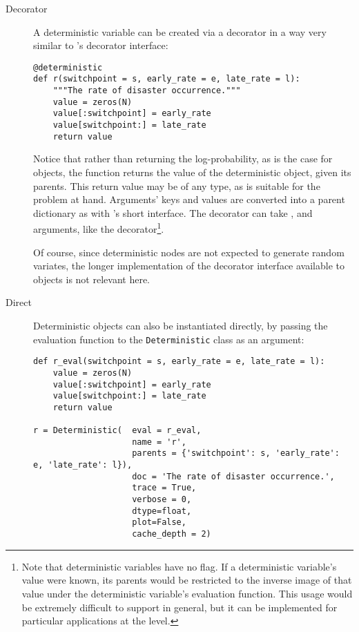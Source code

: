\begin{description}
    \item[Decorator] A deterministic variable can be created via a decorator in a way very similar to 's decorator interface:
\begin{verbatim}
@deterministic
def r(switchpoint = s, early_rate = e, late_rate = l):
    """The rate of disaster occurrence."""
    value = zeros(N)
    value[:switchpoint] = early_rate
    value[switchpoint:] = late_rate
    return value
\end{verbatim}
Notice that rather than returning the log-probability, as is the case for  objects, the function returns the value of the deterministic object, given its parents. This return value may be of any type, as is suitable for the problem at hand. Arguments' keys and values are converted into a parent dictionary as with 's short interface. The  decorator can take ,  and  arguments, like the  decorator\footnote{Note that deterministic variables have no  flag. If a deterministic variable's value were known, its parents would be restricted to the inverse image of that value under the deterministic variable's evaluation function. This usage would be extremely difficult to support in general, but it can be implemented for particular applications at the  level.}.

Of course, since deterministic nodes are not expected to generate random variates, the longer implementation of the decorator interface available to  objects is not relevant here.

    \item[Direct] Deterministic objects can also be instantiated directly, by passing the evaluation function to the \texttt{Deterministic} class as an argument:
\begin{verbatim}
def r_eval(switchpoint = s, early_rate = e, late_rate = l):
    value = zeros(N)
    value[:switchpoint] = early_rate
    value[switchpoint:] = late_rate
    return value

r = Deterministic(  eval = r_eval, 
                    name = 'r',
                    parents = {'switchpoint': s, 'early_rate': e, 'late_rate': l}),
                    doc = 'The rate of disaster occurrence.',
                    trace = True,
                    verbose = 0,
                    dtype=float,
                    plot=False,
                    cache_depth = 2)
\end{verbatim}
\end{description}

